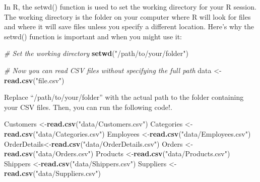 \documentclass[
]{book}
\newenvironment{Shaded}{\begin{snugshade}}{\end{snugshade}}
\newcommand{\CommentTok}[1]{\textcolor[rgb]{0.56,0.35,0.01}{\textit{#1}}}
\newcommand{\FunctionTok}[1]{\textcolor[rgb]{0.13,0.29,0.53}{\textbf{#1}}}
\newcommand{\NormalTok}[1]{#1}
\newcommand{\OtherTok}[1]{\textcolor[rgb]{0.56,0.35,0.01}{#1}}
\newcommand{\StringTok}[1]{\textcolor[rgb]{0.31,0.60,0.02}{#1}}
\begin{document}
In R, the setwd() function is used to set the working directory for your R session. The working directory is the folder on your computer where R will look for files and where it will save files unless you specify a different location. Here's why the setwd() function is important and when you might use it:

\begin{Shaded}
\begin{Highlighting}[]
\CommentTok{\# Set the working directory}
\FunctionTok{setwd}\NormalTok{(}\StringTok{"/path/to/your/folder"}\NormalTok{)}
\end{Highlighting}
\end{Shaded}

\begin{Shaded}
\begin{Highlighting}[]
\CommentTok{\# Now you can read CSV files without specifying the full path}
\NormalTok{data }\OtherTok{\textless{}{-}} \FunctionTok{read.csv}\NormalTok{(}\StringTok{"file.csv"}\NormalTok{)}
\end{Highlighting}
\end{Shaded}

Replace ``/path/to/your/folder'' with the actual path to the folder containing your CSV files. Then, you can run the following code!.

\begin{Shaded}
\begin{Highlighting}[]
\NormalTok{Customers   }\OtherTok{\textless{}{-}}\FunctionTok{read.csv}\NormalTok{(}\StringTok{"data/Customers.csv"}\NormalTok{)}
\NormalTok{Categories  }\OtherTok{\textless{}{-}}\FunctionTok{read.csv}\NormalTok{(}\StringTok{"data/Categories.csv"}\NormalTok{)  }
\NormalTok{Employees   }\OtherTok{\textless{}{-}}\FunctionTok{read.csv}\NormalTok{(}\StringTok{"data/Employees.csv"}\NormalTok{)  }
\NormalTok{OrderDetails}\OtherTok{\textless{}{-}}\FunctionTok{read.csv}\NormalTok{(}\StringTok{"data/OrderDetails.csv"}\NormalTok{)  }
\NormalTok{Orders      }\OtherTok{\textless{}{-}}\FunctionTok{read.csv}\NormalTok{(}\StringTok{"data/Orders.csv"}\NormalTok{)  }
\NormalTok{Products    }\OtherTok{\textless{}{-}}\FunctionTok{read.csv}\NormalTok{(}\StringTok{"data/Products.csv"}\NormalTok{)  }
\NormalTok{Shippers    }\OtherTok{\textless{}{-}}\FunctionTok{read.csv}\NormalTok{(}\StringTok{"data/Shippers.csv"}\NormalTok{)}
\NormalTok{Suppliers   }\OtherTok{\textless{}{-}}\FunctionTok{read.csv}\NormalTok{(}\StringTok{"data/Suppliers.csv"}\NormalTok{)  }
\end{Highlighting}
\end{Shaded}
\end{document}
